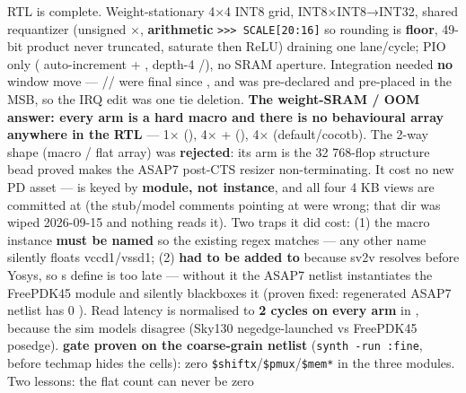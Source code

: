 \begin{record}
\begin{enumerate}
  RTL is complete. Weight-stationary 4×4 INT8 grid, INT8×INT8→INT32,
  shared requantizer (unsigned ×, \textbf{arithmetic}
  \texttt{>>>\ SCALE[20:\allowbreak{}16]} so rounding is \textbf{floor},
  49-bit product never truncated, saturate then ReLU) draining one
  lane/\allowbreak{}cycle; PIO only ( auto-increment +
  , depth-4 /), no SRAM aperture.
  Integration needed \textbf{no} window move ---
  // were final
  since , and  was pre-declared and
  pre-placed in the  MSB, so the IRQ edit was one tie
  deletion. \textbf{The weight-SRAM / OOM answer: every  arm
  is a hard macro and there is no behavioural array anywhere in the RTL}
  --- 1×  (),
  4×  + 
  (), 4× 
  (default/\allowbreak{}cocotb). The  2-way
  shape (macro /  flat array) was \textbf{rejected}: its
   arm is the 32 768-flop structure bead  proved
  makes the ASAP7 post-CTS resizer non-terminating. It cost no new PD
  asset ---  is keyed by \textbf{module, not instance}, and
  all four 4 KB views are committed at  (the
  stub/\allowbreak{}model comments pointing at
   were wrong; that dir was wiped
  2026-09-15 and nothing reads it). Two traps it did cost: (1) the macro
  instance \textbf{must be named } so the existing
   regex matches --- any other name silently
  floats vccd1/\allowbreak{}vssd1; (2)
  \textbf{ had to be added to
  } because sv2v resolves  before
  Yosys, so \textquotesingle s define is too late ---
  without it the ASAP7 netlist instantiates the FreePDK45 module and
  silently blackboxes it (proven fixed: regenerated ASAP7 netlist has 0
  ). Read latency is normalised to
  \textbf{2 cycles on every arm} in , because
  the sim models disagree (Sky130 negedge-launched vs FreePDK45
  posedge). \textbf{ gate proven on the coarse-grain netlist}
  (\texttt{synth\ -\allowbreak{}run\ :\allowbreak{}fine}, before techmap
  hides the cells): zero
  \texttt{\$shiftx}/\texttt{\$pmux}/\texttt{\$mem*} in the three
   modules. Two lessons: the flat count can never be zero

\end{enumerate}
\end{record}
